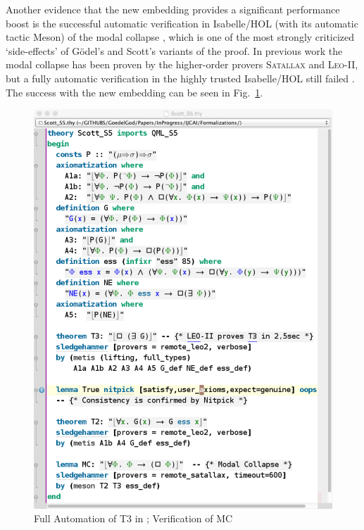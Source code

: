 \documentclass{article}
\begin{document}
Another evidence that the new embedding provides a significant performance boost 
is the successful automatic verification in Isabelle/HOL (with its automatic tactic Meson) of the modal
collapse \cite{Sobel}, which is one of the most strongly criticized
`side-effects' of G\"odel's and Scott's variants of the proof. In previous work 
the modal collapse has been proven by the higher-order provers
\textsc{Satallax} \cite{Satallax} and \textsc{Leo-II}, but a fully automatic
verification in the highly trusted Isabelle/HOL still failed
\cite{J28}.  The success with the new embedding can be seen in Fig.~\ref{Scott_S5}.

\begin{figure}
\centerline{\includegraphics[width=\columnwidth]{./Images/Scott_S5.png}}
\caption{Full Automation of T3 in \SFiveU; Verification of MC} \label{Scott_S5}
\end{figure}
\end{document}
